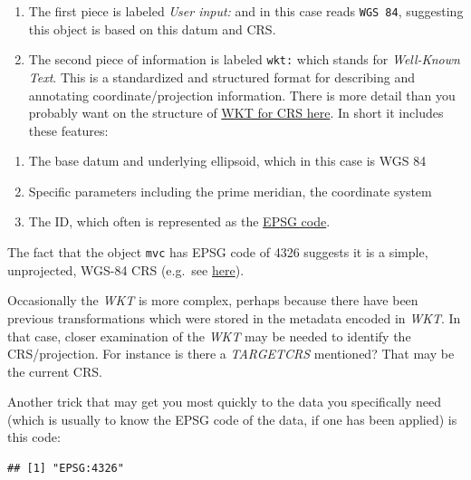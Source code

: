 \documentclass[
]{book}
\newenvironment{Shaded}{\begin{snugshade}}{\end{snugshade}}
\newcommand{\CommentTok}[1]{\textcolor[rgb]{0.56,0.35,0.01}{\textit{#1}}}
\newcommand{\FunctionTok}[1]{\textcolor[rgb]{0.13,0.29,0.53}{\textbf{#1}}}
\newcommand{\NormalTok}[1]{#1}
\newcommand{\SpecialCharTok}[1]{\textcolor[rgb]{0.81,0.36,0.00}{\textbf{#1}}}
\providecommand{\tightlist}{%
  \setlength{\itemsep}{0pt}\setlength{\parskip}{0pt}}
\begin{document}
\begin{enumerate}
\def\labelenumi{\arabic{enumi}.}
\tightlist
\item
  The first piece is labeled \emph{User input:} and in this case reads \texttt{WGS\ 84}, suggesting this object is based on this datum and CRS.
\item
  The second piece of information is labeled \texttt{wkt:} which stands for \emph{Well-Known Text}. This is a standardized and structured format for describing and annotating coordinate/projection information. There is more detail than you probably want on the structure of \href{http://docs.opengeospatial.org/is/12-063r5/12-063r5.html\#43}{WKT for CRS here}. In short it includes these features:
\end{enumerate}

\begin{enumerate}
\def\labelenumi{\alph{enumi}.}
\tightlist
\item
  The base datum and underlying ellipsoid, which in this case is WGS 84
\item
  Specific parameters including the prime meridian, the coordinate system
\item
  The ID, which often is represented as the \href{https://epsg.io/}{EPSG code}.
\end{enumerate}

The fact that the object \texttt{mvc} has EPSG code of 4326 suggests it is a simple, unprojected, WGS-84 CRS (e.g.~see \href{https://epsg.io/?q=4326}{here}).

Occasionally the \emph{WKT} is more complex, perhaps because there have been previous transformations which were stored in the metadata encoded in \emph{WKT}. In that case, closer examination of the \emph{WKT} may be needed to identify the CRS/projection. For instance is there a \emph{TARGETCRS} mentioned? That may be the current CRS.

Another trick that may get you most quickly to the data you specifically need (which is usually to know the EPSG code of the data, if one has been applied) is this code:

\begin{Shaded}
\end{Shaded}

\begin{verbatim}
## [1] "EPSG:4326"
\end{verbatim}
\end{document}

